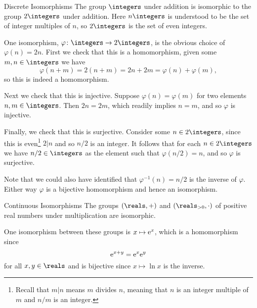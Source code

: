\begin{exm}{Discrete Isomorphisms}{}
    The group \(\integers\) under addition is isomorphic to the group \(2\integers\) under addition.
    Here \(n\integers\) is understood to be the set of integer multiples of \(n\), so \(2\integers\) is the set of even integers.
    
    One isomorphism, \(\varphi\colon \integers \to 2\integers\), is the obvious choice of \(\varphi(n) = 2n\).
    First we check that this is a homomorphism, given some \(m, n \in \integers\) we have
    \begin{equation}
        \varphi(n + m) = 2(n + m) = 2n + 2m = \varphi(n) + \varphi(m),
    \end{equation}
    so this is indeed a homomorphism.
    
    Next we check that this is injective.
    Suppose \(\varphi(n) = \varphi(m)\) for two elements \(n, m \in \integers\).
    Then \(2n = 2m\), which readily implies \(n = m\), and so \(\varphi\) is injective.
    
    Finally, we check that this is surjective.
    Consider some \(n \in 2\integers\), since this is even\footnote{Recall that \(m|n\) means \(m\) divides \(n\), meaning that \(n\) is an integer multiple of \(m\) and \(n/m\) is an integer.} \(2|n\) and so \(n/2\) is an integer.
    It follows that for each \(n \in 2\integers\) we have \(n/2 \in \integers\) as the element such that \(\varphi(n/2) = n\), and so \(\varphi\) is surjective.
    
    Note that we could also have identified that \(\varphi^{-1}(n) = n/2\) is the inverse of \(\varphi\).
    Either way \(\varphi\) is a bijective homomorphism and hence an isomorphism.
\end{exm}

\begin{exm}{Continuous Isomorphisms}{}
    The groups \((\reals, +)\) and \((\reals_{>0}, \cdot)\) of positive real numbers under multiplication are isomorphic.
    
    One isomorphism between these groups is \(x \mapsto \mathrm{e}^{x}\), which is a homomorphism since
    \begin{equation}
        \mathrm{e}^{x + y} = \mathrm{e}^x\mathrm{e}^y
    \end{equation}
    for all \(x, y \in \reals\) and is bijective since \(x \mapsto \ln x\) is the inverse.
\end{exm}


